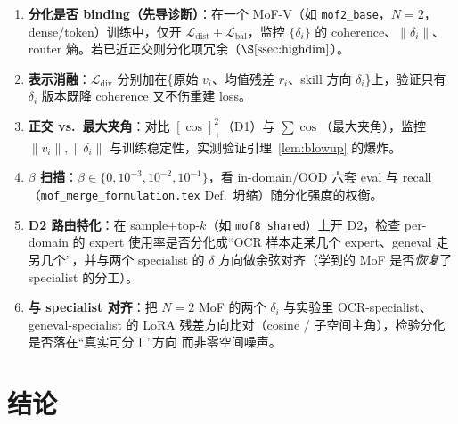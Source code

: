 \documentclass[11pt,a4paper]{article}
\newcommand{\loss}{\mathcal{L}}
\theoremstyle{definition}
\begin{document}
\begin{enumerate}[leftmargin=1.5em]
\item \textbf{分化是否 binding（先导诊断）}：在一个 MoF-V（如 \texttt{mof2\_base}，$N{=}2$，
dense/token）训练中，仅开 $\loss_{\mathrm{dist}}+\loss_{\mathrm{bal}}$，监控 $\{\delta_i\}$ 的
coherence、$\|\delta_i\|$、router 熵。若已近正交则分化项冗余（$\S\ref{ssec:highdim}$）。
\item \textbf{表示消融}：$\loss_{\mathrm{div}}$ 分别加在\{原始 $v_i$、均值残差 $r_i$、skill 方向
$\delta_i$\}上，验证只有 $\delta_i$ 版本既降 coherence 又不伤重建 loss。
\item \textbf{正交 vs.\ 最大夹角}：对比 $[\cos]_+^2$（D1）与 $\sum\cos$（最大夹角），监控
$\|v_i\|,\|\delta_i\|$ 与训练稳定性，实测验证引理~\ref{lem:blowup} 的爆炸。
\item \textbf{$\beta$ 扫描}：$\beta\in\{0,10^{-3},10^{-2},10^{-1}\}$，看 in-domain/OOD 六套 eval
与 recall（\texttt{mof\_merge\_formulation.tex} Def.\ 坍缩）随分化强度的权衡。
\item \textbf{D2 路由特化}：在 sample$+$top-$k$（如 \texttt{mof8\_shared}）上开 D2，检查 per-domain
的 expert 使用率是否分化成``OCR 样本走某几个 expert、geneval 走另几个''，并与两个 specialist 的
$\delta$ 方向做余弦对齐（学到的 MoF 是否\emph{恢复}了 specialist 的分工）。
\item \textbf{与 specialist 对齐}：把 $N{=}2$ MoF 的两个 $\delta_i$ 与实验里 OCR-specialist、
geneval-specialist 的 LoRA 残差方向比对（cosine / 子空间主角），检验分化是否落在``真实可分工''方向
而非零空间噪声。
\end{enumerate}

\section{结论}
\label{sec:concl}
\end{document}
